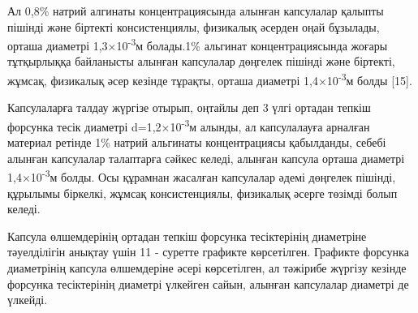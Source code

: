 \begin{multicols}{2}
Ал 0,8\% натрий алгинаты концентрациясында алынған капсулалар қалыпты
пішінді және біртекті консистенциялы, физикалық әсерден оңай бұзылады,
орташа диаметрі 1,3×10\textsuperscript{-3}м болады.1\% альгинат
концентрациясында жоғары тұтқырлыққа байланысты алынған капсулалар
дөңгелек пішінді және біртекті, жұмсақ, физикалық әсер кезінде тұрақты,
орташа диаметрі 1,4×10\textsuperscript{-3}м болды {[}15{]}.

Капсулаларға талдау жүргізе отырып, оңтайлы деп 3 үлгі ортадан тепкіш
форсунка тесік диаметрі d=1,2×10\textsuperscript{-3}м алынды, ал
капсулалауға арналған материал ретінде 1\% натрий альгинаты
концентрациясы қабылданды, себебі алынған капсулалар талаптарға сәйкес
келеді, алынған капсула орташа диаметрі 1,4×10\textsuperscript{-3}м
болды. Осы құрамнан жасалған капсулалар әдемі дөңгелек пішінді, құрылымы
біркелкі, жұмсақ консистенциялы, физикалық әсерге төзімді болып келеді.

Капсула өлшемдерінің ортадан тепкіш форсунка тесіктерінің диаметріне
тәуелділігін анықтау үшін 11 - суретте графикте көрсетілген. Графикте
форсунка диаметрінің капсула өлшемдеріне әсері көрсетілген, ал тәжірибе
жүргізу кезінде форсунка тесіктерінің диаметрі үлкейген сайын, алынған
капсулалар диаметрі де үлкейді.
\end{multicols}

